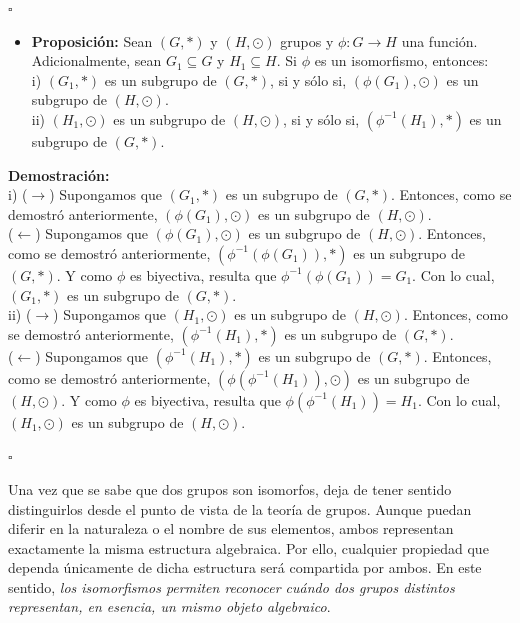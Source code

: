 \documentclass[10 pt]{article}
\begin{document}
\begin{flushright}
    $\square$
\end{flushright}

\begin{itemize}
    \item \Large{\textbf{Proposición:} Sean $(G,*)$ y $(H,\odot)$ grupos y $\phi:G \rightarrow H$ una función. Adicionalmente, sean $G_1 \subseteq G$ y $H_1 \subseteq H$. Si $\phi$ es un isomorfismo, entonces: \\

    i) $(G_1,*)$ es un subgrupo de $(G,*)$, si y sólo si, $(\phi(G_1),\odot)$ es un subgrupo de $(H,\odot)$. \\

    ii) $(H_1,\odot)$ es un subgrupo de $(H,\odot)$, si y sólo si, $(\phi^{-1}(H_1),*)$ es un subgrupo de $(G,*)$.} \\
\end{itemize}

\Large{\textbf{Demostración:} \\

i) ($\rightarrow$) Supongamos que $(G_1,*)$ es un subgrupo de $(G,*)$. Entonces, como se demostró anteriormente, $(\phi(G_1),\odot)$ es un subgrupo de $(H,\odot)$. \\

($\leftarrow$) Supongamos que $(\phi(G_1),\odot)$ es un subgrupo de $(H,\odot)$. Entonces, como se demostró anteriormente, $(\phi^{-1}(\phi(G_1)),*)$ es un subgrupo de $(G,*)$. Y como $\phi$ es biyectiva, resulta que $\phi^{-1}(\phi(G_1))=G_1$. Con lo cual, $(G_1,*)$ es un subgrupo de $(G,*)$. \\

ii) ($\rightarrow$) Supongamos que $(H_1,\odot)$ es un subgrupo de $(H,\odot)$. Entonces, como se demostró anteriormente, $(\phi^{-1}(H_1),*)$ es un subgrupo de $(G,*)$. \\

($\leftarrow$) Supongamos que $(\phi^{-1}(H_1),*)$ es un subgrupo de $(G,*)$. Entonces, como se demostró anteriormente, $(\phi(\phi^{-1}(H_1)),\odot)$ es un subgrupo de $(H,\odot)$. Y como $\phi$ es biyectiva, resulta que $\phi(\phi^{-1}(H_1))=H_1$. Con lo cual, $(H_1,\odot)$ es un subgrupo de $(H,\odot)$.} \\

\begin{flushright}
    $\square$
\end{flushright}

\Large{Una vez que se sabe que dos grupos son isomorfos, deja de tener sentido distinguirlos desde el punto de vista de la teoría de grupos. Aunque puedan diferir en la naturaleza o el nombre de sus elementos, ambos representan exactamente la misma estructura algebraica. Por ello, cualquier propiedad que dependa únicamente de dicha estructura será compartida por ambos. En este sentido, \textit{los isomorfismos permiten reconocer cuándo dos grupos distintos representan, en esencia, un mismo objeto algebraico}.} \\
\end{document}
